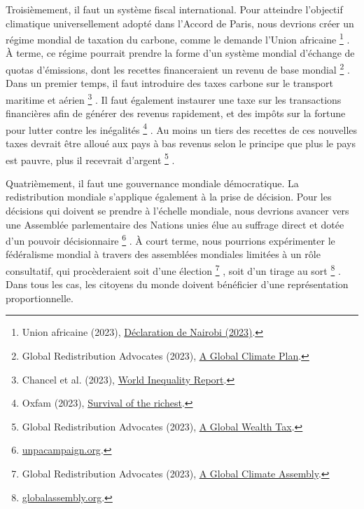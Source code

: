 \documentclass[a5paper,french]{memoir}
\begin{document}
Troisièmement, il faut un système fiscal international. Pour atteindre l'objectif climatique universellement adopté dans l'Accord de Paris, nous devrions créer un régime mondial de taxation du carbone, comme le demande l'Union africaine
\footnote{Union africaine (2023), \href{https://media.africaclimatesummit.org/NAIROBI+Declaration+FURTHER+edited+060923+EN+920AM.pdf}{Déclaration de Nairobi (2023)}.}%
.  À terme, ce régime pourrait prendre la forme d'un système mondial d'échange de quotas d'émissions, dont les recettes financeraient un revenu de base mondial
\footnote{Global Redistribution Advocates (2023), \href{https://github.com/bixiou/global\_tax\_attitudes/raw/main/paper/policy\_brief\_GCS.pdf}{A Global Climate Plan}.}%
. Dans un premier temps, il faut introduire des taxes carbone sur le transport maritime et aérien
\footnote{Chancel et al. (2023), \href{https://wid.world/wp-content/uploads/2023/01/CBV2023-ClimateInequalityReport-3.pdf}{World Inequality Report}.}%
. Il faut également instaurer une taxe sur les transactions financières afin de générer des revenus rapidement, et des impôts sur la fortune pour lutter contre les inégalités
\footnote{Oxfam (2023), \href{https://oxfamilibrary.openrepository.com/bitstream/handle/10546/621477/mn-survival-of-the-richest-methodology-160123-en.pdf}{Survival of the richest}.}%
. Au moins un tiers des recettes de ces nouvelles taxes devrait être alloué aux pays à bas revenus selon le principe que plus le pays est pauvre, plus il recevrait d'argent
\footnote{Global Redistribution Advocates (2023), \href{https://github.com/bixiou/global\_tax\_attitudes/raw/main/paper/policy\_brief\_tax.pdf}{A Global Wealth Tax}.}%
.

Quatrièmement, il faut une gouvernance mondiale démocratique. La redistribution mondiale s'applique également à la prise de décision. Pour les décisions qui doivent se prendre à l'échelle mondiale, nous devrions avancer vers une Assemblée parlementaire des Nations unies élue au suffrage direct et dotée d'un pouvoir décisionnaire
\footnote{\href{https://www.unpacampaign.org/}{unpacampaign.org}.}%
. À court terme, nous pourrions expérimenter le fédéralisme mondial à travers des assemblées mondiales limitées à un rôle consultatif, qui procèderaient soit d'une élection
\footnote{Global Redistribution Advocates (2023), \href{https://github.com/bixiou/global\_tax\_attitudes/raw/main/paper/policy\_brief\_assembly.pdf}{A Global Climate Assembly}.}%
, soit d'un tirage au sort
\footnote{\href{https://globalassembly.org/}{globalassembly.org}.}%
. Dans tous les cas, les citoyens du monde doivent bénéficier d'une représentation proportionnelle.
\end{document}
